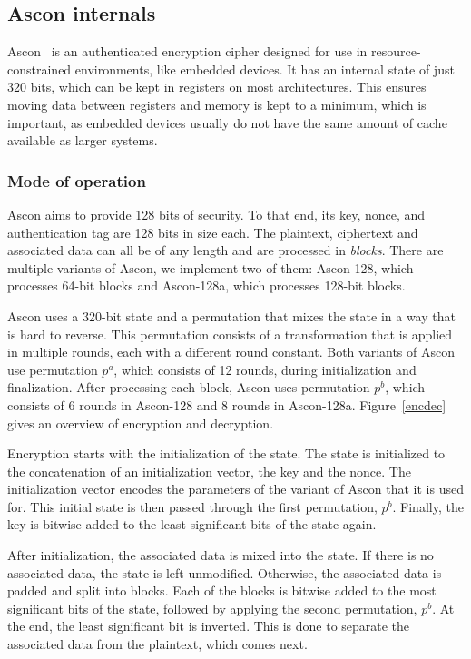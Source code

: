 \subsection{Ascon internals}

Ascon~\cite{ascon} is an authenticated encryption cipher designed for use in
resource-constrained environments, like embedded devices. It has an internal
state of just 320 bits, which can be kept in registers on most architectures.
This ensures moving data between registers and memory is kept to a minimum,
which is important, as embedded devices usually do not have the same amount of
cache available as larger systems.

\subsubsection{Mode of operation}

Ascon aims to provide 128 bits of security. To that end, its key, nonce, and
authentication tag are 128 bits in size each. The plaintext, ciphertext and
associated data can all be of any length and are processed in \emph{blocks}.
There are multiple variants of Ascon, we implement two of them: Ascon-128, which
processes 64-bit blocks and Ascon-128a, which processes 128-bit blocks.

Ascon uses a 320-bit state and a permutation that mixes the state in a way that
is hard to reverse. This permutation consists of a transformation that is
applied in multiple rounds, each with a different round constant. Both variants
of Ascon use permutation $p^a$, which consists of 12 rounds, during
initialization and finalization. After processing each block, Ascon uses
permutation $p^b$, which consists of 6 rounds in Ascon-128 and 8 rounds in
Ascon-128a. Figure~\ref{encdec} gives an overview of encryption and decryption.



Encryption starts with the initialization of the state. The state is initialized
to the concatenation of an initialization vector, the key and the nonce. The
initialization vector encodes the parameters of the variant of Ascon that it is
used for. This initial state is then passed through the first permutation,
$p^b$. Finally, the key is bitwise added to the least significant bits of the
state again.

After initialization, the associated data is mixed into the state. If there is
no associated data, the state is left unmodified. Otherwise, the associated data
is padded and split into blocks. Each of the blocks is bitwise added to the most
significant bits of the state, followed by applying the second permutation,
$p^b$. At the end, the least significant bit is inverted. This is done to
separate the associated data from the plaintext, which comes next.

